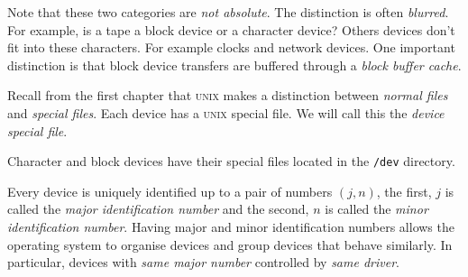 Note that these two categories are \textit{not absolute}. 
The distinction is often \textit{blurred}. For example, is a tape a 
block device or a character device? Others devices don't fit 
into these characters.
For example clocks and network devices.
One important distinction is that block device transfers 
are buffered through a \textit{block buffer cache}.




\frmrule


Recall from the first chapter that \textsc{unix} makes a distinction between \textit{normal files}
and \textit{special files}. Each device has a \textsc{unix} special file.
We will call this the \textit{device special file}. 


\begin{figure}[h]
\end{figure}

Character and block devices have their special files located in the \lstinline{/dev} directory.


\frmrule

Every device is uniquely identified up to a pair of numbers $(j,n)$,
the first, $j$ is called the \textit{major identification number} 
and the second, $n$ is called the \textit{minor identification number}. 
Having major and minor identification numbers allows the operating system 
to organise devices and group devices that behave similarly. In particular, 
devices with \textit{same major number} controlled by \textit{same driver}.


